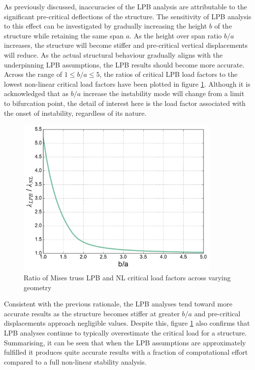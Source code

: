 As previously discussed, inaccuracies of the LPB analysis are attributable to the significant pre-critical deflections of the structure. The sensitivity of LPB analysis to this effect can be investigated by gradually increasing the height $b$ of the structure while retaining the same span $a$. As the height over span ratio $b/a$ increases, the structure will become stiffer and pre-critical vertical displacements will reduce. As the actual structural behaviour gradually aligns with the underpinning LPB assumptions, the LPB results should become more accurate. Across the range of $1 \le b/a \le 5$, the ratios of critical LPB load factors to the lowest non-linear critical load factors have been plotted in figure \ref{stab3}. Although it is acknowledged that as $b/a$ increase the instability mode will change from a limit to bifurcation point, the detail of interest here is the load factor associated with the onset of instability, regardless of its nature.

\begin{figure}[H]
	\centering
	\def\svgwidth{\columnwidth}
	\includegraphics[width=10cm]{images/stability_analysis_mises_truss_lpb.pdf}
	\caption{Ratio of Mises truss LPB and NL critical load factors across varying geometry}
	\label{stab3}
\end{figure}

Consistent with the previous rationale, the LPB analyses tend toward more accurate results as the structure becomes stiffer at greater $b/a$ and pre-critical displacements approach negligible values. Despite this, figure \ref{stab3} also confirms that LPB analyses continue to typically overestimate the critical load for a structure. Summarising, it can be seen that when the LPB assumptions are approximately fulfilled it produces quite accurate results with a fraction of computational effort compared to a full non-linear stability analysis.

